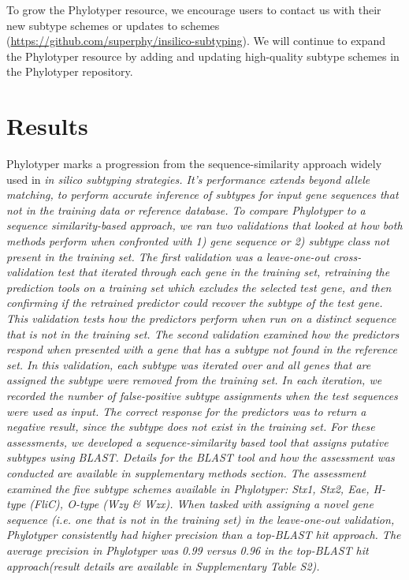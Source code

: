\documentclass{bioinfo}
\begin{document}
To grow the Phylotyper resource, we encourage users to contact us with their new subtype schemes or updates to schemes (\url{https://github.com/superphy/insilico-subtyping}). 
We will continue to expand the Phylotyper resource by adding and updating high-quality subtype schemes in the Phylotyper repository.

\section{Results}

Phylotyper marks a progression from the sequence-similarity approach widely used in \it{in silico} subtyping strategies.
It's performance extends beyond allele matching, to perform accurate inference of subtypes for input gene sequences that not in the training data or reference database.
To compare Phylotyper to a sequence similarity-based approach, we ran two validations that looked at how both methods perform when confronted with 1) gene sequence or 2) subtype class not present in the training set.
The first validation was a leave-one-out cross-validation test that iterated through each gene in the training set, retraining the prediction tools on a training set which excludes the selected test gene, and then confirming if the retrained predictor could recover the subtype of the test gene.
This validation tests how the predictors perform when run on a distinct sequence that is not in the training set.
The second validation examined how the predictors respond when presented with a gene that has a subtype not found in the reference set.
In this validation, each subtype was iterated over and all genes that are assigned the subtype were removed from the training set.
In each iteration, we recorded the number of false-positive subtype assignments when the test sequences were used as input.
The correct response for the predictors was to return a negative result, since the subtype does not exist in the training set.
For these assessments, we developed a sequence-similarity based tool that assigns putative subtypes using BLAST.
Details for the BLAST tool and how the assessment was conducted are available in supplementary methods section.
The assessment examined the five subtype schemes available in Phylotyper: Stx1, Stx2, Eae, H-type (FliC), O-type (Wzy \& Wzx).
When tasked with assigning a novel gene sequence (i.e. one that is not in the training set) in the leave-one-out validation, Phylotyper consistently had higher precision than a top-BLAST hit approach.
The average precision in Phylotyper was 0.99 versus 0.96 in the top-BLAST hit approach(result details are available in Supplementary Table S2).
\end{document}
